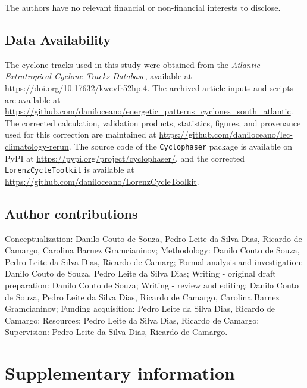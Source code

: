 \documentclass[pdflatex,sn-chicago]{sn-jnl}%
\theoremstyle{plain}
\theoremstyle{definition}
\theoremstyle{remark}
\theoremstyle{definition}
\begin{document}
The authors have no relevant financial or non-financial interests to disclose.

\subsection*{Data Availability}

The cyclone tracks used in this study were obtained from the \textit{Atlantic Extratropical Cyclone Tracks Database}, available at \url{https://doi.org/10.17632/kwcvfr52hp.4}. The archived article inputs and scripts are available at \url{https://github.com/daniloceano/energetic_patterns_cyclones_south_atlantic}. The corrected calculation, validation products, statistics, figures, and provenance used for this correction are maintained at \url{https://github.com/daniloceano/lec-climatology-rerun}. The source code of the \texttt{Cyclophaser} package is available on PyPI at \url{https://pypi.org/project/cyclophaser/}, and the corrected \texttt{LorenzCycleToolkit} is available at \url{https://github.com/daniloceano/LorenzCycleToolkit}.

\subsection*{Author contributions}

Conceptualization: Danilo Couto de Souza, Pedro Leite da Silva Dias, Ricardo de Camargo, Carolina Barnez Gramcianinov; Methodology: Danilo Couto de Souza, Pedro Leite da Silva Dias, Ricardo de Camarg; Formal analysis and investigation: Danilo Couto de Souza, Pedro Leite da Silva Dias; Writing - original draft preparation: Danilo Couto de Souza; Writing - review and editing: Danilo Couto de Souza, Pedro Leite da Silva Dias, Ricardo de Camargo, Carolina Barnez Gramcianinov; Funding acquisition: Pedro Leite da Silva Dias, Ricardo de Camargo; Resources: Pedro Leite da Silva Dias, Ricardo de Camargo; Supervision: Pedro Leite da Silva Dias, Ricardo de Camargo.


\section*{Supplementary information}

\renewcommand{\thefigure}{S\arabic{figure}}
\setcounter{figure}{0}
\end{document}

